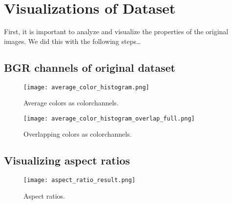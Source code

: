 \section{Visualizations of Dataset}
\begin{fullwidth}First, it is important to analyze and visualize the properties of the original images. 
We did this with the following steps\dots\end{fullwidth}

\subsection{BGR channels of original dataset}

\begin{figure}[H] %
	\texttt{[image: average\_color\_histogram.png]}
	\caption{Average colors as colorchannels.}
	\label{fig:average_color_histogram} %
\end{figure}

\begin{figure}[H] %
	\texttt{[image: average\_color\_histogram\_overlap\_full.png]}
	\caption{Overlapping colors as colorchannels.}
	\label{fig:average_color_histogram_overlap_full} %
\end{figure}

\newpage
\subsection{Visualizing aspect ratios}

\begin{figure}[H] %
	\texttt{[image: aspect\_ratio\_result.png]}
	\caption{Aspect ratios.}
	\label{fig:aspect_ratio_result} %
\end{figure}

